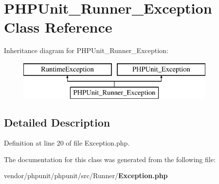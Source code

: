 \section{P\+H\+P\+Unit\+\_\+\+Runner\+\_\+\+Exception Class Reference}
\label{class_p_h_p_unit___runner___exception}
Inheritance diagram for P\+H\+P\+Unit\+\_\+\+Runner\+\_\+\+Exception\+:\begin{figure}[H]
\begin{center}
\leavevmode
\includegraphics[height=2.000000cm]{class_p_h_p_unit___runner___exception}
\end{center}
\end{figure}


\subsection{Detailed Description}


Definition at line 20 of file Exception.\+php.



The documentation for this class was generated from the following file\+:\begin{DoxyCompactItemize}
\item 
vendor/phpunit/phpunit/src/\+Runner/{\bf Exception.\+php}\end{DoxyCompactItemize}
